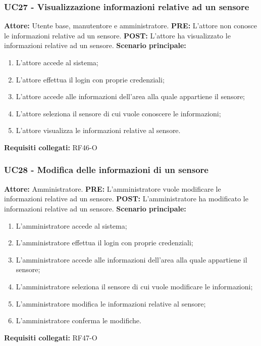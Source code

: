 \documentclass[a4paper, 12pt]{article}
\begin{document}
\subsubsection{UC27 - Visualizzazione informazioni relative ad un sensore}
\textbf{Attore: } Utente base, manutentore e amministratore.\newline
\textbf{PRE: } L'attore non conosce le informazioni relative ad un sensore.\newline
\textbf{POST: } L'attore ha visualizzato le informazioni relative ad un sensore.\newline
\textbf{Scenario principale: }
\begin{enumerate}
    \item L'attore accede al sistema;
    \item L'attore effettua il login con proprie credenziali;
    \item L'attore accede alle informazioni dell'area alla quale appartiene il sensore;
    \item L'attore seleziona il sensore di cui vuole conoscere le informazioni;
    \item L'attore visualizza le informazioni relative al sensore.
\end{enumerate}
\textbf{Requisiti collegati: } RF46-O\newline

\subsubsection{UC28 - Modifica delle informazioni di un sensore}
\textbf{Attore: } Amministratore.\newline
\textbf{PRE: } L'amministratore vuole modificare le informazioni relative ad un sensore.\newline
\textbf{POST: } L'amministratore ha modificato le informazioni relative ad un sensore.\newline
\textbf{Scenario principale: }
\begin{enumerate}
    \item L'amministratore accede al sistema;
    \item L'amministratore effettua il login con proprie credenziali;
    \item L'amministratore accede alle informazioni dell'area alla quale appartiene il sensore;
    \item L'amministratore seleziona il sensore di cui vuole modificare le informazioni;
    \item L'amministratore modifica le informazioni relative al sensore;
    \item L'amministratore conferma le modifiche.
\end{enumerate}
\textbf{Requisiti collegati: } RF47-O\newline
\end{document}
